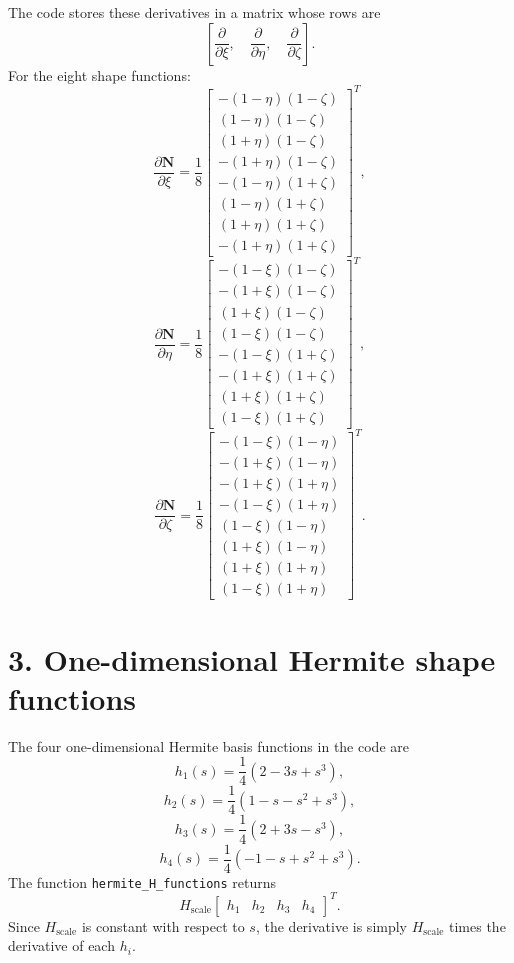 \documentclass[11pt]{article}
\newcommand{\pd}[2]{\frac{\partial #1}{\partial #2}}
\newcommand{\Hs}{H_{\mathrm{scale}}}
\begin{document}
The code stores these derivatives in a matrix whose rows are
\[
\left[
\pd{}{\xi},\quad
\pd{}{\eta},\quad
\pd{}{\zeta}
\right].
\]
For the eight shape functions:
\[
\pd{\mathbf N}{\xi}
=
\frac18
\begin{bmatrix}
-(1-\eta)(1-\zeta)\\
 (1-\eta)(1-\zeta)\\
 (1+\eta)(1-\zeta)\\
-(1+\eta)(1-\zeta)\\
-(1-\eta)(1+\zeta)\\
 (1-\eta)(1+\zeta)\\
 (1+\eta)(1+\zeta)\\
-(1+\eta)(1+\zeta)
\end{bmatrix}^{T},
\]
\[
\pd{\mathbf N}{\eta}
=
\frac18
\begin{bmatrix}
-(1-\xi)(1-\zeta)\\
-(1+\xi)(1-\zeta)\\
 (1+\xi)(1-\zeta)\\
 (1-\xi)(1-\zeta)\\
-(1-\xi)(1+\zeta)\\
-(1+\xi)(1+\zeta)\\
 (1+\xi)(1+\zeta)\\
 (1-\xi)(1+\zeta)
\end{bmatrix}^{T},
\]
\[
\pd{\mathbf N}{\zeta}
=
\frac18
\begin{bmatrix}
-(1-\xi)(1-\eta)\\
-(1+\xi)(1-\eta)\\
-(1+\xi)(1+\eta)\\
-(1-\xi)(1+\eta)\\
 (1-\xi)(1-\eta)\\
 (1+\xi)(1-\eta)\\
 (1+\xi)(1+\eta)\\
 (1-\xi)(1+\eta)
\end{bmatrix}^{T}.
\]

\section*{3. One-dimensional Hermite shape functions}

The four one-dimensional Hermite basis functions in the code are
\[
h_1(s)=\frac14(2-3s+s^3),
\]
\[
h_2(s)=\frac14(1-s-s^2+s^3),
\]
\[
h_3(s)=\frac14(2+3s-s^3),
\]
\[
h_4(s)=\frac14(-1-s+s^2+s^3).
\]
The function \texttt{hermite\_H\_functions} returns
\[
\Hs
\begin{bmatrix}
h_1 & h_2 & h_3 & h_4
\end{bmatrix}^{T}.
\]
Since $\Hs$ is constant with respect to $s$, the derivative is simply
$\Hs$ times the derivative of each $h_i$.
\end{document}
